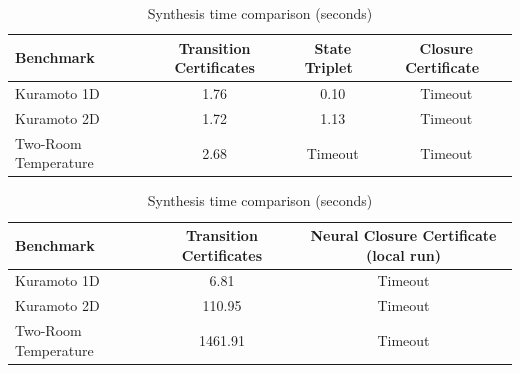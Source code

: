 \begin{table}[t]
\centering
\caption{Synthesis time comparison (seconds)}
\label{tab:results-poly}
\begin{tabular}{lccc}
\hline
\textbf{Benchmark} & \textbf{Transition Certificates} & \textbf{State Triplet~\cite{wongpiromsarn2015automata}} & \textbf{Closure Certificate~\cite{murali2024closure}} \\
\hline
Kuramoto 1D & 1.76 & 0.10 & Timeout \\
Kuramoto 2D & 1.72 & 1.13 & Timeout \\
Two-Room Temperature & 2.68 & Timeout & Timeout \\
\hline
\end{tabular}
\end{table}
\begin{table}[t]
\centering
\caption{Synthesis time comparison (seconds)}
\label{tab:results-neural}
\begin{tabular}{lcc}
\hline
\textbf{Benchmark} & \textbf{Transition Certificates} & \textbf{Neural Closure Certificate (local run)} \\
\hline
Kuramoto 1D & 6.81 & Timeout \\
Kuramoto 2D & 110.95 & Timeout \\
Two-Room Temperature & 1461.91 & Timeout \\
\hline
\end{tabular}
\end{table}
